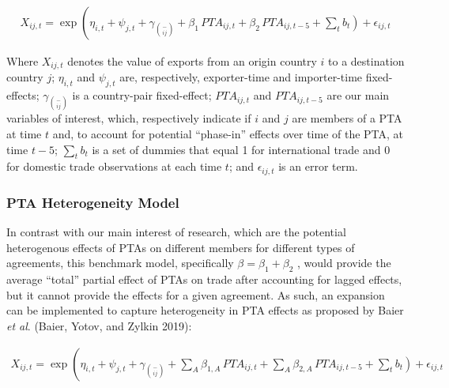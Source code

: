 \documentclass[12pt]{article}%
\begin{document}
\begin{multline}
    X_{ij,t} = \exp\left(\eta_{i,t} + \psi_{j,t} + \gamma_{\binom{-}{ij}} + \beta_{1} \, PTA_{ij,t} \right. + \beta_{2} \, PTA_{ij,t-5} + \left. \sum_{t} b_{t} \right) + \epsilon_{ij,t}
\end{multline}

Where \(X_{ij,t}\) denotes the value of exports from an origin country
\(i\) to a destination country \(j\); \(\eta_{i,t}\) and \(\psi_{j,t}\)
are, respectively, exporter-time and importer-time fixed-effects;
\(\gamma_{\binom{-}{ij}}\) is a country-pair fixed-effect;
\({PTA}_{ij,t}\) and \({PTA}_{ij,t - 5}\) are our main variables of
interest, which, respectively indicate if \(i\) and \(j\) are members of
a PTA at time \(t\) and, to account for potential ``phase-in'' effects
over time of the PTA, at time \(t - 5\); \(\sum_{t}^{}b_{t}\) is a set
of dummies that equal 1 for international trade and 0 for domestic trade
observations at each time \(t\); and \(\epsilon_{ij,t}\) is an error
term.%
\subsubsection{PTA Heterogeneity Model}%
\label{ssubsec:PTAHeterogeneityModel}%

%
In contrast with our main interest of research, which are the potential
heterogenous effects of PTAs on different members for different types of
agreements, this benchmark model, specifically
\(\beta = \beta_{1} + \beta_{2}\) , would provide the average ``total''
partial effect of PTAs on trade after accounting for lagged effects, but
it cannot provide the effects for a given agreement. As such, an
expansion can be implemented to capture heterogeneity in PTA effects as
proposed by Baier \emph{et al}. (Baier, Yotov, and Zylkin 2019):

\begin{multline}
    X_{ij,t} = \exp\left(\eta_{i,t} + \psi_{j,t} + \gamma_{\binom{-}{ij}} + \sum_{A} \beta_{1,A} \, PTA_{ij,t} \right. + \sum_{A} \beta_{2,A} \, PTA_{ij,t-5} + \left. \sum_{t} b_{t} \right) + \epsilon_{ij,t}
\end{multline}
\end{document}
